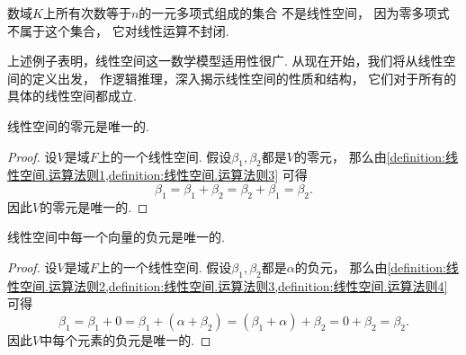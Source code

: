 \begin{example}
数域\(K\)上所有次数等于\(n\)的一元多项式组成的集合
不是线性空间，
因为零多项式不属于这个集合，
它对线性运算不封闭.
\end{example}

上述例子表明，线性空间这一数学模型适用性很广.
从现在开始，我们将从线性空间的定义出发，
作逻辑推理，深入揭示线性空间的性质和结构，
它们对于所有的具体的线性空间都成立.

\begin{property}%
线性空间的零元是唯一的.
\begin{proof}
设\(V\)是域\(F\)上的一个线性空间.
假设\(\beta_1,\beta_2\)都是\(V\)的零元，
那么由\cref{definition:线性空间.运算法则1,definition:线性空间.运算法则3}
可得\begin{equation*}
	\beta_1
	= \beta_1 + \beta_2
	= \beta_2 + \beta_1
	= \beta_2.
\end{equation*}
因此\(V\)的零元是唯一的.
\end{proof}
\end{property}

\begin{property}\label{theorem:线性空间.线性空间的结构.线性空间的性质2}
线性空间中每一个向量的负元是唯一的.
\begin{proof}
设\(V\)是域\(F\)上的一个线性空间.
假设\(\beta_1,\beta_2\)都是\(\alpha\)的负元，
那么由\cref{definition:线性空间.运算法则2,definition:线性空间.运算法则3,definition:线性空间.运算法则4}
可得\begin{equation*}
	\beta_1
	= \beta_1 + 0
	= \beta_1 + (\alpha + \beta_2)
	= (\beta_1 + \alpha) + \beta_2
	= 0 + \beta_2
	= \beta_2.
\end{equation*}
因此\(V\)中每个元素的负元是唯一的.
\end{proof}
\end{property}

